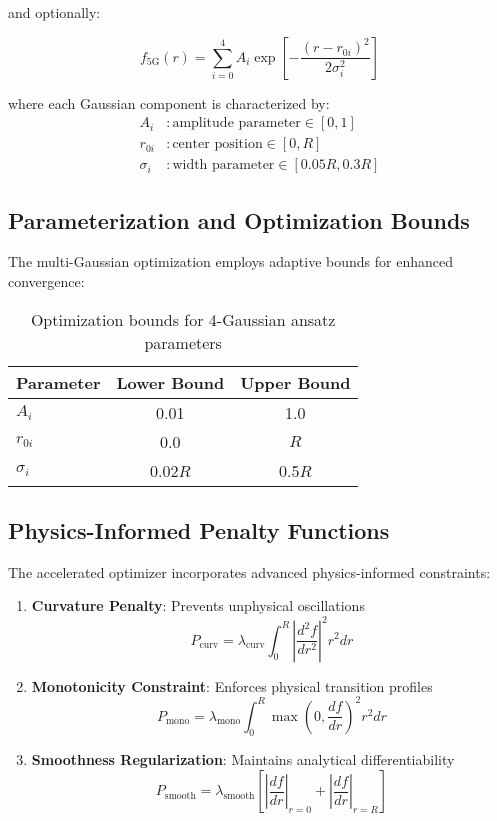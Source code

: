 \documentclass[12pt,a4paper]{article}
\begin{document}
and optionally:

\begin{equation}
f_{\text{5G}}(r) = \sum_{i=0}^{4} A_i \exp\left[-\frac{(r - r_{0i})^2}{2\sigma_i^2}\right]
\end{equation}

where each Gaussian component is characterized by:
\begin{align}
A_i &: \text{amplitude parameter} \in [0, 1] \\
r_{0i} &: \text{center position} \in [0, R] \\
\sigma_i &: \text{width parameter} \in [0.05R, 0.3R]
\end{align}

\subsection{Parameterization and Optimization Bounds}

The multi-Gaussian optimization employs adaptive bounds for enhanced convergence:

\begin{table}[h]
\centering
\begin{tabular}{lcc}
\toprule
Parameter & Lower Bound & Upper Bound \\
\midrule
$A_i$ & 0.01 & 1.0 \\
$r_{0i}$ & 0.0 & $R$ \\
$\sigma_i$ & 0.02$R$ & 0.5$R$ \\
\bottomrule
\end{tabular}
\caption{Optimization bounds for 4-Gaussian ansatz parameters}
\end{table}

\subsection{Physics-Informed Penalty Functions}

The accelerated optimizer incorporates advanced physics-informed constraints:

\begin{enumerate}
\item \textbf{Curvature Penalty}: Prevents unphysical oscillations
\begin{equation}
P_{\text{curv}} = \lambda_{\text{curv}} \int_0^R \left|\frac{d^2f}{dr^2}\right|^2 r^2 dr
\end{equation}

\item \textbf{Monotonicity Constraint}: Enforces physical transition profiles
\begin{equation}
P_{\text{mono}} = \lambda_{\text{mono}} \int_0^R \max\left(0, \frac{df}{dr}\right)^2 r^2 dr
\end{equation}

\item \textbf{Smoothness Regularization}: Maintains analytical differentiability
\begin{equation}
P_{\text{smooth}} = \lambda_{\text{smooth}} \left[\left|\frac{df}{dr}\right|_{r=0} + \left|\frac{df}{dr}\right|_{r=R}\right]
\end{equation}
\end{enumerate}
\end{document}
